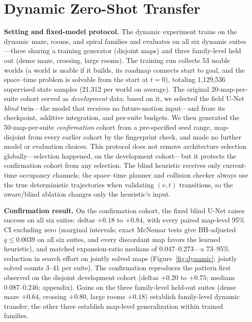 \documentclass[letterpaper]{article} %
\begin{document}
\section{Dynamic Zero-Shot Transfer}

\textbf{Setting and fixed-model protocol.} The dynamic experiment trains on the dynamic maze, rooms, and spiral families and evaluates on all six dynamic suites---three sharing a training generator (disjoint maps) and three family-level held out (dense maze, crossing, large rooms). The training run collects 53 usable worlds (a world is usable if it builds, its roadmap connects start to goal, and the space--time problem is solvable from the start at $t{=}0$), totaling 1{,}129{,}536 supervised state samples (21{,}312 per world on average). The original 20-map-per-suite cohort served as \emph{development} data: based on it, we selected the field U-Net \emph{blind} twin---the model that receives no future-motion input---and froze its checkpoint, additive integration, and per-suite budgets. We then generated the 50-map-per-suite \emph{confirmation} cohort from a pre-specified seed range, map-disjoint from every earlier cohort by the fingerprint check, and made no further model or evaluation choices. This protocol does not remove architecture selection globally---selection happened, on the development cohort---but it protects the confirmation cohort from any selection. The blind heuristic receives only current-time occupancy channels; the space--time planner and collision checker always use the true deterministic trajectories when validating $(v,t)$ transitions, so the aware/blind ablation changes only the heuristic's input.

\textbf{Confirmation result.} On the confirmation cohort, the fixed blind U-Net raises success on all six suites: deltas $+0.18$ to $+0.84$, with every paired map-level 95\% CI excluding zero (marginal intervals; exact McNemar tests give BH-adjusted $q \leq 0.0039$ on all six suites, and every discordant map favors the learned heuristic), and matched expansion-ratio medians of 0.047--0.273---a 73--95\% reduction in search effort on jointly solved maps (Figure~\ref{fig:dynamic}; jointly solved counts 3--41 per suite). The confirmation reproduces the pattern first observed on the disjoint development cohort (deltas $+0.20$ to $+0.75$; medians 0.087--0.246; appendix). Gains on the three family-level held-out suites (dense maze $+0.64$, crossing $+0.80$, large rooms $+0.18$) establish family-level dynamic transfer; the other three establish map-level generalization within trained families.
\end{document}

